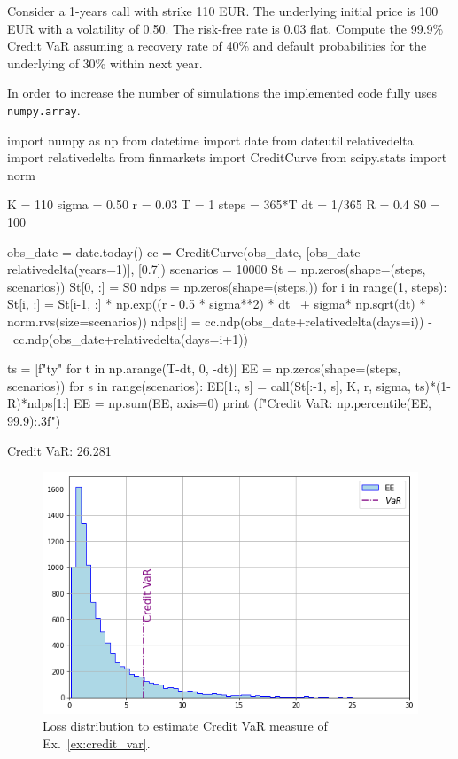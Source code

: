 \begin{question}
\label{ex:credit_var}
Consider a 1-years call with strike 110 EUR. The underlying initial price is 100 EUR with a volatility of 0.50. The risk-free rate is 0.03 flat. Compute the 99.9\% Credit VaR assuming a recovery rate of 40\% and default probabilities for the underlying of 30\% within next year.
\end{question}

\cprotEnv\begin{solution}

In order to increase the number of simulations the implemented code fully uses \texttt{numpy.array}.

\begin{ipython}
import numpy as np
from datetime import date
from dateutil.relativedelta import relativedelta
from finmarkets import CreditCurve
from scipy.stats import norm


K = 110
sigma = 0.50
r = 0.03
T = 1
steps = 365*T
dt = 1/365
R = 0.4
S0 = 100

obs_date = date.today()
cc = CreditCurve(obs_date, [obs_date + relativedelta(years=1)], [0.7])
scenarios = 10000
St = np.zeros(shape=(steps, scenarios))
St[0, :] = S0
ndps = np.zeros(shape=(steps,))
for i in range(1, steps):
    St[i, :] = St[i-1, :] * np.exp((r - 0.5 * sigma**2) * dt \
                                   + sigma* np.sqrt(dt) * norm.rvs(size=scenarios))
    ndps[i] = cc.ndp(obs_date+relativedelta(days=i)) - \
        cc.ndp(obs_date+relativedelta(days=i+1))

ts = [f"{t}y" for t in np.arange(T-dt, 0, -dt)]
EE = np.zeros(shape=(steps, scenarios))
for s in range(scenarios):
    EE[1:, s] = call(St[:-1, s], K, r, sigma, ts)*(1-R)*ndps[1:]
EE = np.sum(EE, axis=0)
print (f"Credit VaR: {np.percentile(EE, 99.9):.3f}")
\end{ipython}
\begin{ioutput}
Credit VaR: 26.281
\end{ioutput}

\begin{figure}[htbp]
\centering
\includegraphics[width=0.7\linewidth]{figures/cr_var_ex}
\caption{Loss distribution to estimate Credit VaR measure of Ex.~\ref{ex:credit_var}.}
\end{figure}
\end{solution}





